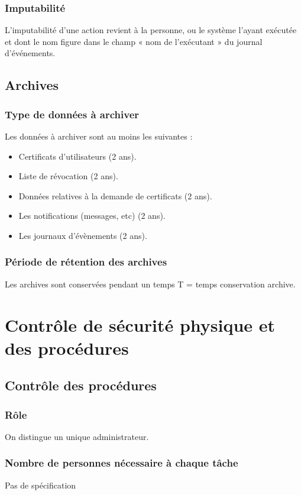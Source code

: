 \documentclass[a4paper,11pt,french]{book}
\begin{document}
\subsubsection{Imputabilité}
L’imputabilité d’une action revient à la personne, ou le système l’ayant exécutée et dont le nom figure dans le champ « nom de l’exécutant » du journal d’événements.

\subsection{Archives}
\subsubsection{Type de données à archiver}
Les données à archiver sont au moins les suivantes :
\begin{itemize}
\item Certificats d’utilisateurs (2 ans).
\item Liste de révocation (2 ans).
\item Données relatives à la demande de certificats (2 ans).
\item Les notifications (messages, etc) (2 ans).
\item Les journaux d'évènements (2 ans).
\end{itemize}

\subsubsection{Période de rétention des archives}
Les archives sont conservées pendant un temps T = temps conservation archive.

\section{Contrôle de sécurité physique et des procédures}

\subsection{Contrôle des procédures}
\subsubsection{Rôle}
On distingue un unique administrateur.

\subsubsection{Nombre de personnes nécessaire à chaque tâche}
Pas de spécification
\end{document}

